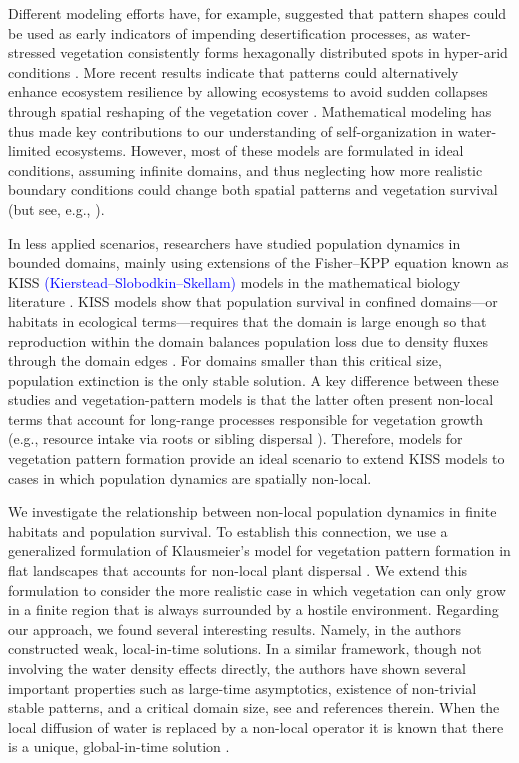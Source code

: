 \documentclass[11pt, a4paper]{article}
\theoremstyle{break}
\theoremstyle{break}
\theoremstyle{break}
\theoremstyle{break}
\theoremstyle{break}
\theoremstyle{break}
\theoremstyle{break}
\theoremstyle{break}
\theoremstyle{break}
\theoremstyle{break}
\begin{document}
Different modeling efforts have, for example, suggested that pattern shapes could be used as early indicators of impending desertification processes, as water-stressed vegetation consistently forms hexagonally distributed spots in hyper-arid conditions \cite{Lefever1997,VonHardenberg2001,Meron2004,Rietkerk2002}. More recent results indicate that patterns could alternatively enhance ecosystem resilience by allowing ecosystems to avoid sudden collapses through spatial reshaping of the vegetation cover \cite{Rietkerk2021}. Mathematical modeling has thus made key contributions to our understanding of self-organization in water-limited ecosystems. However, most of these models are formulated in ideal conditions, assuming infinite domains, and thus neglecting how more realistic boundary conditions could change both spatial patterns and vegetation survival (but see, e.g., \cite{Clerc2021,PintoRamos2023,PintoRamos2025}).

In less applied scenarios, researchers have studied population dynamics in bounded domains, mainly using extensions of the Fisher–KPP equation \cite{Cantrell1999,Fagan2009,Colombo2018,Dornelas2024} known as KISS \textcolor{blue}{(Kierstead–Slobodkin–Skellam)} models in the mathematical biology literature \cite{Skellam1951,Kierstead1953}. KISS models show that population survival in confined domains---or habitats in ecological terms---requires that the domain is large enough so that reproduction within the domain balances population loss due to density fluxes through the domain edges \cite{Cantrell2004}. For domains smaller than this critical size, population extinction is the only stable solution. A key difference between these studies and vegetation-pattern models is that the latter often present non-local terms that account for long-range processes responsible for vegetation growth (e.g., resource intake via roots or sibling dispersal \cite{Martinez-Garcia2014,Eigentler2018}). Therefore, models for vegetation pattern formation provide an ideal scenario to extend KISS models to cases in which population dynamics are spatially non-local. 

We investigate the relationship between non-local population dynamics in finite habitats and population survival. To establish this connection, we use a generalized formulation of Klausmeier's model for vegetation pattern formation in flat landscapes that accounts for non-local plant dispersal \cite{Eigentler2018,Klausmeier1999}. We extend this formulation to consider the more realistic case in which vegetation can only grow in a finite region that is always surrounded by a hostile environment. Regarding our approach, we found several interesting results. Namely, in \cite{JaramilloMeraz2024,CappaneraJaramilloWard2024} the authors constructed weak, local-in-time solutions. In a similar framework, though not involving the water density effects directly, the authors have shown several important properties such as large-time asymptotics, existence of non-trivial stable patterns, and a critical domain size, see \cite{Tadej2025,BaiLiWang2025,ReimerBonsallMaini2015,Sun2023} and references therein. When the local diffusion of water is replaced by a non-local operator it is known that there is a unique, global-in-time solution \cite{LaurencotWalker2023}.
\end{document}
